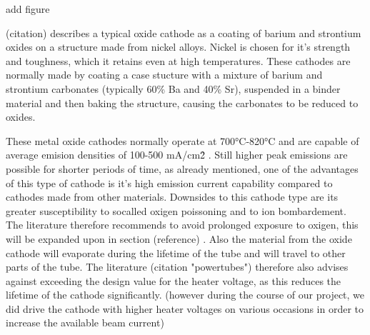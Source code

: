add figure 

(citation)  describes a typical oxide cathode as a coating of barium and strontium oxides on a structure made from nickel alloys. Nickel is chosen for it's strength and toughness, which it retains even at high temperatures. These cathodes are normally made by coating a case stucture with a mixture of barium and strontium carbonates (typically 60\% Ba and 40\% Sr), suspended in a binder material and then baking the structure, causing the carbonates to be reduced to oxides. 

These metal oxide cathodes normally operate at 700°C-820°C  and are capable of average emision densities of 100-500 mA/cm\^2 . Still higher peak emissions are possible for shorter periods of time, as already mentioned, one of the advantages of this type of cathode is it's high emission current capability compared to cathodes made from other materials. Downsides to this cathode type are its greater susceptibility to socalled oxigen poissoning and to ion bombardement. The  literature therefore recommends to avoid prolonged exposure to oxigen, this will be expanded upon in section (reference) . Also the material from the oxide cathode will evaporate during the lifetime of the tube and will travel to other parts of the tube. The literature (citation "powertubes") therefore also advises against exceeding the design value  for the heater voltage, as this reduces the lifetime of the cathode significantly. (however during the course of our project, we did drive the cathode with higher heater voltages on various occasions in order to increase the available beam current)













